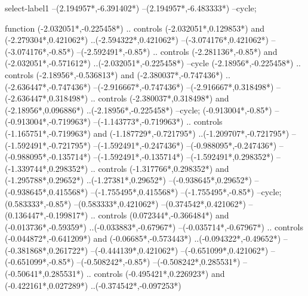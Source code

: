 {\begin{scope}[x=1mm,y=1mm,line width=\SCstroke mm,line cap=round,line join=round]
\begin{SCpart}{select-label1}
--({2.194957*\SCF},{-6.391402*\SCF})
--({2.194957*\SCF},{-6.483333*\SCF})
--cycle;
\end{SCpart}
\begin{SCpart}{function}
 ({-2.032051*\SCF},{-0.225458*\SCF})
.. controls ({-2.032051*\SCF},{0.129853*\SCF}) and ({-2.279304*\SCF},{0.421062*\SCF}) ..({-2.594322*\SCF},{0.421062*\SCF})
--({-3.074176*\SCF},{0.421062*\SCF})
--({-3.074176*\SCF},{-0.85*\SCF})
--({-2.592491*\SCF},{-0.85*\SCF})
.. controls ({-2.281136*\SCF},{-0.85*\SCF}) and ({-2.032051*\SCF},{-0.571612*\SCF}) ..({-2.032051*\SCF},{-0.225458*\SCF})
--cycle
({-2.18956*\SCF},{-0.225458*\SCF})
.. controls ({-2.18956*\SCF},{-0.536813*\SCF}) and ({-2.380037*\SCF},{-0.747436*\SCF}) ..({-2.636447*\SCF},{-0.747436*\SCF})
--({-2.916667*\SCF},{-0.747436*\SCF})
--({-2.916667*\SCF},{0.318498*\SCF})
--({-2.636447*\SCF},{0.318498*\SCF})
.. controls ({-2.380037*\SCF},{0.318498*\SCF}) and ({-2.18956*\SCF},{0.096886*\SCF}) ..({-2.18956*\SCF},{-0.225458*\SCF})
--cycle;
 ({-0.913004*\SCF},{-0.85*\SCF})
--({-0.913004*\SCF},{-0.719963*\SCF})
--({-1.143773*\SCF},{-0.719963*\SCF})
.. controls ({-1.165751*\SCF},{-0.719963*\SCF}) and ({-1.187729*\SCF},{-0.721795*\SCF}) ..({-1.209707*\SCF},{-0.721795*\SCF})
--({-1.592491*\SCF},{-0.721795*\SCF})
--({-1.592491*\SCF},{-0.247436*\SCF})
--({-0.988095*\SCF},{-0.247436*\SCF})
--({-0.988095*\SCF},{-0.135714*\SCF})
--({-1.592491*\SCF},{-0.135714*\SCF})
--({-1.592491*\SCF},{0.298352*\SCF})
--({-1.339744*\SCF},{0.298352*\SCF})
.. controls ({-1.317766*\SCF},{0.298352*\SCF}) and ({-1.295788*\SCF},{0.29652*\SCF}) ..({-1.27381*\SCF},{0.29652*\SCF})
--({-0.938645*\SCF},{0.29652*\SCF})
--({-0.938645*\SCF},{0.415568*\SCF})
--({-1.755495*\SCF},{0.415568*\SCF})
--({-1.755495*\SCF},{-0.85*\SCF})
--cycle;
 ({0.583333*\SCF},{-0.85*\SCF})
--({0.583333*\SCF},{0.421062*\SCF})
--({0.374542*\SCF},{0.421062*\SCF})
--({0.136447*\SCF},{-0.199817*\SCF})
.. controls ({0.072344*\SCF},{-0.366484*\SCF}) and ({-0.013736*\SCF},{-0.59359*\SCF}) ..({-0.033883*\SCF},{-0.67967*\SCF})
--({-0.035714*\SCF},{-0.67967*\SCF})
.. controls ({-0.044872*\SCF},{-0.641209*\SCF}) and ({-0.06685*\SCF},{-0.573443*\SCF}) ..({-0.094322*\SCF},{-0.49652*\SCF})
--({-0.381868*\SCF},{0.261722*\SCF})
--({-0.444139*\SCF},{0.421062*\SCF})
--({-0.651099*\SCF},{0.421062*\SCF})
--({-0.651099*\SCF},{-0.85*\SCF})
--({-0.508242*\SCF},{-0.85*\SCF})
--({-0.508242*\SCF},{0.285531*\SCF})
--({-0.50641*\SCF},{0.285531*\SCF})
.. controls ({-0.495421*\SCF},{0.226923*\SCF}) and ({-0.422161*\SCF},{0.027289*\SCF}) ..({-0.374542*\SCF},{-0.097253*\SCF})

\end{SCpart}
\end{scope}}
